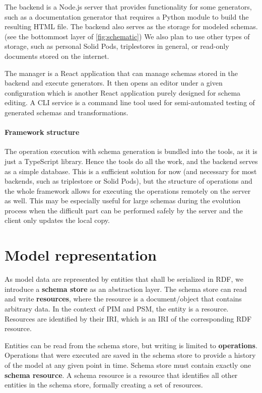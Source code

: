The backend is a Node.js server that provides functionality for some generators, such as a documentation generator that requires a Python module to build the resulting HTML file. The backend also serves as the storage for modeled schemas. (see the bottommost layer of \autoref{fig:schematic}) We also plan to use other types of storage, such as personal Solid Pods, triplestores in general, or read-only documents stored on the internet.

The manager is a React application that can manage schemas stored in the backend and execute generators. It then opens an editor under a given configuration which is another React application purely designed for schema editing. A CLI service is a command line tool used for semi-automated testing of generated schemas and transformations.

\paragraph{Framework structure} The operation execution with schema generation is bundled into the tools, as it is just a TypeScript library. Hence the tools do all the work, and the backend serves as a simple database. This is a sufficient solution for now (and necessary for most backends, such as triplestore or Solid Pods), but the structure of operations and the whole framework allows for executing the operations remotely on the server as well. This may be especially useful for large schemas during the evolution process when the difficult part can be performed safely by the server and the client only updates the local copy.

\section{Model representation} %

As model data are represented by entities that shall be serialized in RDF, we introduce a \textbf{schema store} as an abstraction layer. The schema store can read and write \textbf{resources}, where the resource is a document/object that contains arbitrary data. In the context of PIM and PSM, the entity is a resource. Resources are identified by their IRI, which is an IRI of the corresponding RDF resource.

Entities can be read from the schema store, but writing is limited to \textbf{operations}. Operations that were executed are saved in the schema store to provide a history of the model at any given point in time. Schema store must contain exactly one \textbf{schema resource}. A schema resource is a resource that identifies all other entities in the schema store, formally creating a set of resources.


